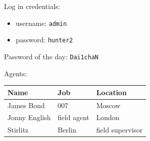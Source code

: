 \documentclass[parskip=half]{scrartcl}
\begin{document}
Log in credentials:
\begin{itemize}
  \item username: \texttt{admin}
  \item password: \texttt{hunter2}
\end{itemize}

Password of the day: \texttt{Dai1chaN}

Agents:

\begin{center}
\begin{tabular}{ | l | l | l | }
  \hline
  Name & Job & Location\\
  \hline
  \hline
  James Bond & 007 & Moscow\\
  Jonny English & field agent & London\\
  Stirlitz & Berlin & field supervisor\\
  \hline
\end{tabular}
\end{center}
\end{document}
